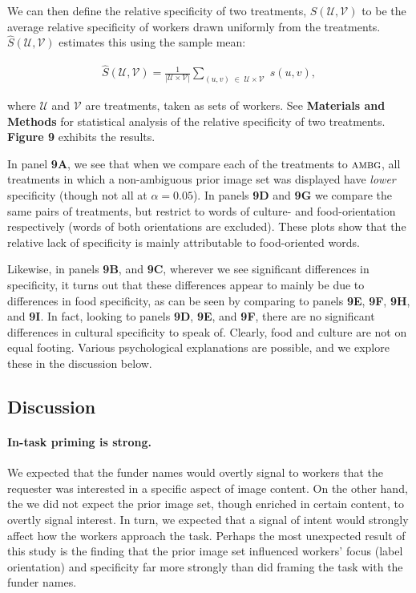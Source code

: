 \documentclass[a4paper]{report}
\begin{document}
We can then define the relative specificity of two treatments, 
$S(\mathcal{U},\mathcal{V})$ to be the average
relative specificity of workers drawn uniformly from the treatments.  
$\hat{S}({\mathcal{U}, \mathcal{V}})$ estimates this using the sample mean:

\begin{align}
	\hat{S}(\mathcal{U},\mathcal{V}) = 
	\frac{1}{|\mathcal{U} \times \mathcal{V}|}
	\sum_{(u,v) \; \in \; \mathcal{U} \times \mathcal{V}} \;
		s(u,v),
		\label{eq:specificity}
\end{align}

where $\mathcal{U}$ and $\mathcal{V}$ are treatments, taken as sets of workers.
See \textbf{Materials and Methods} for statistical analysis of the relative 
specificity of two treatments. 
\textbf{Figure 9} 
exhibits the results.

In panel \textbf{9A}, we see that when we compare each of the treatments to
$\textsc{ambg}$, all treatments in which a non-ambiguous prior image set was 
displayed have \textit{lower} specificity (though not all at $\alpha=0.05$).  
In panels \textbf{9D} and \textbf{9G} we compare the same pairs of treatments, 
but restrict to words of culture- and food-orientation respectively (words
of both orientations are excluded).  These plots show that the relative lack 
of specificity is mainly attributable to food-oriented words.  

Likewise, in panels \textbf{9B}, and \textbf{9C}, 
wherever we see significant differences in specificity, it turns out that
these differences appear to mainly be due to differences in food specificity,
as can be seen by comparing to panels \textbf{9E}, \textbf{9F}, \textbf{9H}, 
and \textbf{9I}.  In fact, looking to panels \textbf{9D}, \textbf{9E}, and 
\textbf{9F},
there are no significant differences in cultural specificity to speak of. 
Clearly, food and culture are not on equal footing.  Various psychological 
explanations are possible, and we explore these in the discussion below.

\subsection*{Discussion}

\paragraph{In-task priming is strong.}  We expected that the funder names 
would overtly signal to workers that the requester was interested in a 
specific aspect of image content.  On the other hand, the we did not 
expect the prior image set, though enriched in certain content, to overtly signal interest.  In turn, we expected that a signal of intent would 
strongly affect how the workers approach the task.  Perhaps the most unexpected
result of this study is the finding that the prior image set influenced 
workers' focus (label orientation) and specificity far more strongly than did 
framing the task with the funder names.
\end{document}
